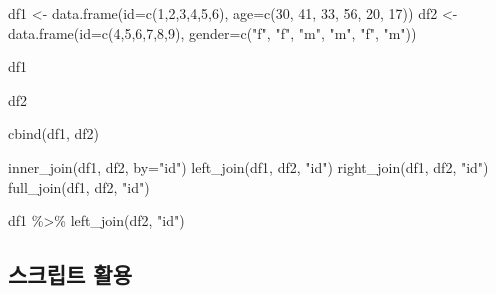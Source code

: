 \documentclass[
]{book}
\newenvironment{Shaded}{\begin{snugshade}}{\end{snugshade}}
\newcommand{\AttributeTok}[1]{\textcolor[rgb]{0.77,0.63,0.00}{#1}}
\newcommand{\DecValTok}[1]{\textcolor[rgb]{0.00,0.00,0.81}{#1}}
\newcommand{\FunctionTok}[1]{\textcolor[rgb]{0.00,0.00,0.00}{#1}}
\newcommand{\NormalTok}[1]{#1}
\newcommand{\OtherTok}[1]{\textcolor[rgb]{0.56,0.35,0.01}{#1}}
\newcommand{\SpecialCharTok}[1]{\textcolor[rgb]{0.00,0.00,0.00}{#1}}
\newcommand{\StringTok}[1]{\textcolor[rgb]{0.31,0.60,0.02}{#1}}
\begin{document}
\begin{Shaded}
\begin{Highlighting}[]
\NormalTok{df1 }\OtherTok{\textless{}{-}} \FunctionTok{data.frame}\NormalTok{(}\AttributeTok{id=}\FunctionTok{c}\NormalTok{(}\DecValTok{1}\NormalTok{,}\DecValTok{2}\NormalTok{,}\DecValTok{3}\NormalTok{,}\DecValTok{4}\NormalTok{,}\DecValTok{5}\NormalTok{,}\DecValTok{6}\NormalTok{), }\AttributeTok{age=}\FunctionTok{c}\NormalTok{(}\DecValTok{30}\NormalTok{, }\DecValTok{41}\NormalTok{, }\DecValTok{33}\NormalTok{, }\DecValTok{56}\NormalTok{, }\DecValTok{20}\NormalTok{, }\DecValTok{17}\NormalTok{))}
\NormalTok{df2 }\OtherTok{\textless{}{-}} \FunctionTok{data.frame}\NormalTok{(}\AttributeTok{id=}\FunctionTok{c}\NormalTok{(}\DecValTok{4}\NormalTok{,}\DecValTok{5}\NormalTok{,}\DecValTok{6}\NormalTok{,}\DecValTok{7}\NormalTok{,}\DecValTok{8}\NormalTok{,}\DecValTok{9}\NormalTok{), }\AttributeTok{gender=}\FunctionTok{c}\NormalTok{(}\StringTok{"f"}\NormalTok{, }\StringTok{"f"}\NormalTok{, }\StringTok{"m"}\NormalTok{, }\StringTok{"m"}\NormalTok{, }\StringTok{"f"}\NormalTok{, }\StringTok{"m"}\NormalTok{))}

\NormalTok{df1}
\end{Highlighting}
\end{Shaded}

\begin{Shaded}
\begin{Highlighting}[]
\NormalTok{df2}
\end{Highlighting}
\end{Shaded}

\begin{Shaded}
\begin{Highlighting}[]
\FunctionTok{cbind}\NormalTok{(df1, df2)}

\FunctionTok{inner\_join}\NormalTok{(df1, df2, }\AttributeTok{by=}\StringTok{"id"}\NormalTok{)}
\FunctionTok{left\_join}\NormalTok{(df1, df2, }\StringTok{"id"}\NormalTok{)}
\FunctionTok{right\_join}\NormalTok{(df1, df2, }\StringTok{"id"}\NormalTok{)}
\FunctionTok{full\_join}\NormalTok{(df1, df2, }\StringTok{"id"}\NormalTok{)}

\NormalTok{df1 }\SpecialCharTok{\%\textgreater{}\%} \FunctionTok{left\_join}\NormalTok{(df2, }\StringTok{"id"}\NormalTok{)}
\end{Highlighting}
\end{Shaded}

\hypertarget{uxc2a4uxd06cuxb9bduxd2b8-uxd65cuxc6a9}{%
\subsection{스크립트 활용}\label{uxc2a4uxd06cuxb9bduxd2b8-uxd65cuxc6a9}}
\end{document}
